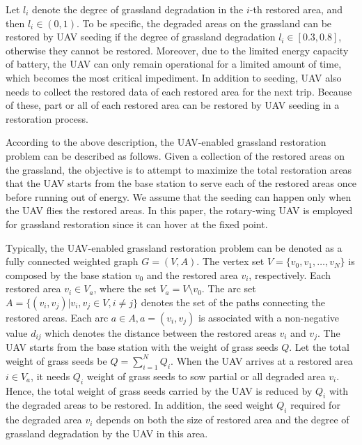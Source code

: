 \documentclass[preprint,5pt]{elsarticle}
\begin{document}
Let $l_i$ denote the degree of grassland degradation in the $i$-th restored area, and then $l_i \in (0,1)$. To be specific, the degraded areas on the grassland can be restored by UAV seeding if the degree of grassland degradation $l_i \in [0.3,0.8]$, otherwise they cannot be restored. Moreover, due to the limited energy capacity of battery, the UAV can only remain operational for a limited amount of time, which becomes the most critical impediment. In addition to seeding, UAV also needs to collect the restored data of each restored area for the next trip. Because of these,
part or all of each restored area can be restored by UAV seeding in a restoration process.

According to the above description, the UAV-enabled grassland restoration problem can be described as follows. Given a collection of the restored areas on the grassland, the objective is to attempt to maximize the total restoration areas %
that the UAV starts from the base station to serve each of the restored areas once before running out of energy. %
We assume that the seeding can happen only when the UAV flies the restored areas. In this paper, the rotary-wing UAV is employed for grassland restoration since it can hover at the fixed point.

Typically, the UAV-enabled grassland restoration problem can be denoted as a fully connected weighted graph $G = (V, A)$. The vertex set $V = \{v_0, v_1, \ldots, v_N\}$ is composed by the base station $v_0$ and the restored area $v_i$, respectively. Each restored area $v_i \in V_a$, where the set $V_a = V \setminus v_0$.
The arc set $A = \{(v_i, v_j)| v_i, v_j \in V, i \neq j\}$ denotes the set of the paths connecting the restored areas. Each arc $a \in A, a = (v_i, v_j)$ is associated with a non-negative value $d_{ij}$ which denotes the distance between the restored areas $v_i$ and $v_j$. The UAV starts from the base station with the weight of grass seeds $Q$. Let the total weight of grass seeds be $Q = \sum^N_{i=1}Q_i$. When the UAV arrives at a restored area $i \in V_a$, it needs $Q_i$ weight of grass seeds to sow partial or all degraded area $v_i$. Hence, the total weight of grass seeds carried by the UAV is reduced by $Q_i$ with the degraded areas to be restored. In addition, the seed weight $Q_i$ required for the degraded area $v_i$ depends on both the size of restored area and the degree of grassland degradation by the UAV in this area. %
\end{document}
